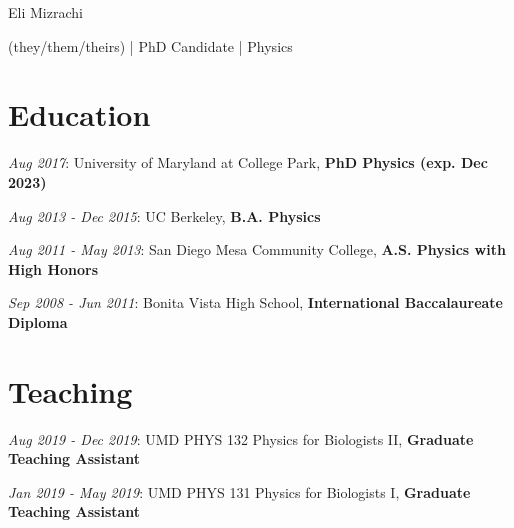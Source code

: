 \documentclass[
  10pt,
  letterpaper,
  DIV=11,
  numbers=noendperiod]{scrartcl}
\author{}
\date{}
\begin{document}
\ifdefined\Shaded\renewenvironment{Shaded}{\begin{tcolorbox}[boxrule=0pt, enhanced, borderline west={3pt}{0pt}{shadecolor}, interior hidden, breakable, sharp corners, frame hidden]}{\end{tcolorbox}}\fi

\begin{center}

\begin{LARGE}Eli Mizrachi\end{LARGE}

\begin{small}(they/them/theirs) | PhD Candidate | Physics\end{small}

\href{mailto:emiz@umd.edu}{}
\href{https://e-miz.github.io}{}

\end{center}

\hypertarget{fa-user-graduate-education}{%
\section{\texorpdfstring{
Education}{ Education}}\label{fa-user-graduate-education}}

\textcolor{mygray}{\textit{Aug 2017}}: University of Maryland at College
Park, \textbf{PhD Physics (exp. Dec 2023)}

\textcolor{mygray}{\textit{Aug 2013 - Dec 2015}}: UC Berkeley,
\textbf{B.A. Physics}

\textcolor{mygray}{\textit{Aug 2011 - May 2013}}: San Diego Mesa
Community College, \textbf{A.S. Physics with High Honors}

\textcolor{mygray}{\textit{Sep 2008 - Jun 2011}}: Bonita Vista High
School, \textbf{International Baccalaureate Diploma}

\hypertarget{fa-school-teaching}{%
\section{\texorpdfstring{
Teaching}{ Teaching}}\label{fa-school-teaching}}

\textcolor{mygray}{\textit{Aug 2019 - Dec 2019}}: UMD PHYS 132 Physics
for Biologists II, \textbf{Graduate Teaching Assistant}

\textcolor{mygray}{\textit{Jan 2019 - May 2019}}: UMD PHYS 131 Physics
for Biologists I, \textbf{Graduate Teaching Assistant}
\end{document}
